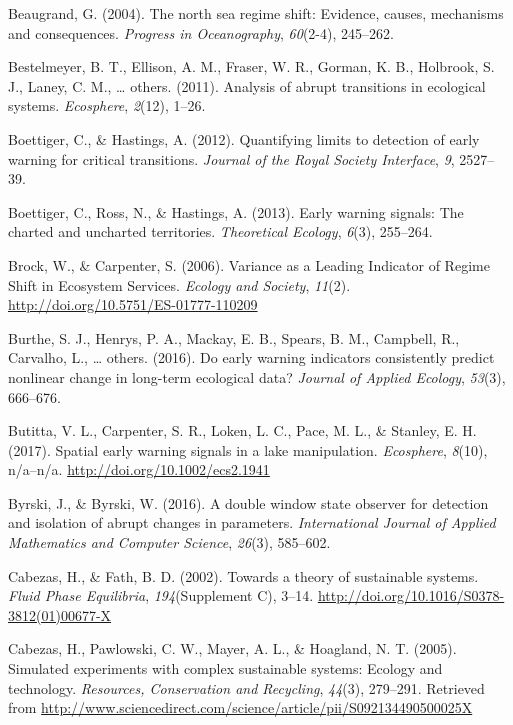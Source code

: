 \documentclass[12pt,twoside,openany]{reedthesis}
\begin{document}
\hypertarget{ref-beaugrand2004north}{}
Beaugrand, G. (2004). The north sea regime shift: Evidence, causes,
mechanisms and consequences. \emph{Progress in Oceanography},
\emph{60}(2-4), 245--262.

\hypertarget{ref-bestelmeyer_analysis_2011}{}
Bestelmeyer, B. T., Ellison, A. M., Fraser, W. R., Gorman, K. B.,
Holbrook, S. J., Laney, C. M., \ldots{} others. (2011). Analysis of
abrupt transitions in ecological systems. \emph{Ecosphere},
\emph{2}(12), 1--26.

\hypertarget{ref-boettiger_quantifying_2012}{}
Boettiger, C., \& Hastings, A. (2012). Quantifying limits to detection
of early warning for critical transitions. \emph{Journal of the Royal
Society Interface}, \emph{9}, 2527--39.

\hypertarget{ref-boettiger_early_2013}{}
Boettiger, C., Ross, N., \& Hastings, A. (2013). Early warning signals:
The charted and uncharted territories. \emph{Theoretical Ecology},
\emph{6}(3), 255--264.

\hypertarget{ref-brock_variance_2006}{}
Brock, W., \& Carpenter, S. (2006). Variance as a Leading Indicator of
Regime Shift in Ecosystem Services. \emph{Ecology and Society},
\emph{11}(2). \url{http://doi.org/10.5751/ES-01777-110209}

\hypertarget{ref-burthe2016early}{}
Burthe, S. J., Henrys, P. A., Mackay, E. B., Spears, B. M., Campbell,
R., Carvalho, L., \ldots{} others. (2016). Do early warning indicators
consistently predict nonlinear change in long-term ecological data?
\emph{Journal of Applied Ecology}, \emph{53}(3), 666--676.

\hypertarget{ref-butitta_spatial_2017}{}
Butitta, V. L., Carpenter, S. R., Loken, L. C., Pace, M. L., \& Stanley,
E. H. (2017). Spatial early warning signals in a lake manipulation.
\emph{Ecosphere}, \emph{8}(10), n/a--n/a.
\url{http://doi.org/10.1002/ecs2.1941}

\hypertarget{ref-byrski2016double}{}
Byrski, J., \& Byrski, W. (2016). A double window state observer for
detection and isolation of abrupt changes in parameters.
\emph{International Journal of Applied Mathematics and Computer
Science}, \emph{26}(3), 585--602.

\hypertarget{ref-cabezas_towards_2002}{}
Cabezas, H., \& Fath, B. D. (2002). Towards a theory of sustainable
systems. \emph{Fluid Phase Equilibria}, \emph{194}(Supplement C), 3--14.
\url{http://doi.org/10.1016/S0378-3812(01)00677-X}

\hypertarget{ref-cabezas_simulated_2005}{}
Cabezas, H., Pawlowski, C. W., Mayer, A. L., \& Hoagland, N. T. (2005).
Simulated experiments with complex sustainable systems: Ecology and
technology. \emph{Resources, Conservation and Recycling}, \emph{44}(3),
279--291. Retrieved from
\url{http://www.sciencedirect.com/science/article/pii/S092134490500025X}
\end{document}
